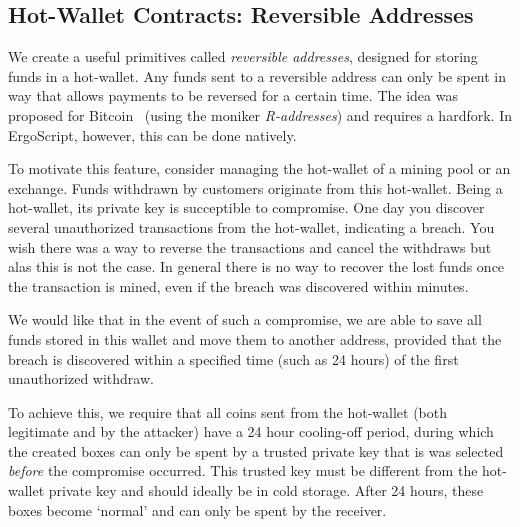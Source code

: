 \documentclass[11pt]{article}
\newcommand{\langname}{ErgoScript\xspace}
\begin{document}
\subsection{Hot-Wallet Contracts: Reversible Addresses}

We create a useful primitives called {\em reversible addresses}, designed for storing funds in a hot-wallet. %
Any funds sent to a reversible address can only be spent in way that allows payments to be reversed for a certain time. The idea was proposed for Bitcoin~\cite{raddress} (using the moniker {\em R-addresses}) and requires a hardfork. In \langname, however, this can be done natively.

To motivate this feature, consider managing the hot-wallet of a mining pool or an exchange. Funds withdrawn by customers originate from this hot-wallet. Being a hot-wallet, its private key is succeptible to compromise. One day you discover several unauthorized transactions from the hot-wallet, indicating a breach. You wish there was a way to reverse the transactions and cancel the withdraws but alas this is not the case. In general there is no way to recover the lost funds once the transaction is mined, even if the breach was discovered within minutes. 

We would like that in the event of such a compromise, we are able to save all funds stored in this wallet and move them to another address, provided that the breach is discovered within a specified time (such as 24 hours) of the first unauthorized withdraw. 

To achieve this, we require that all coins sent from the hot-wallet (both legitimate and by the attacker)
have a 24 hour cooling-off period, during which the created boxes can only be spent by a trusted private key that is was selected {\em before} the compromise occurred. This trusted key must be different from the hot-wallet private key and should ideally be in cold storage. 
After 24 hours, these boxes become `normal' and can only be spent by the receiver.
\end{document}
